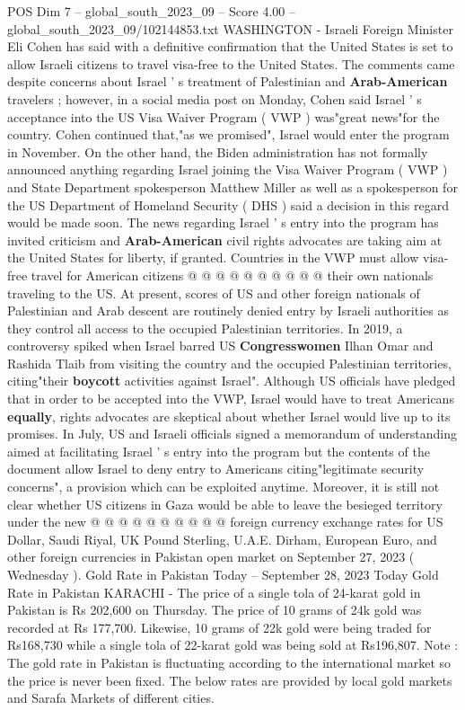 \begin{textsample}{POS Dim 7 – global\_south\_2023\_09 – Score 4.00 – global\_south\_2023\_09/102144853.txt}  \label{ex:f7_pos_121}
WASHINGTON - Israeli Foreign Minister Eli Cohen has said with a definitive confirmation that the United States is set to allow Israeli citizens to travel visa-free to the United States.
The comments came despite concerns about Israel ' s treatment of Palestinian and \textbf{Arab-American} travelers ; however, in a social media post on Monday, Cohen said Israel ' s acceptance into the US Visa Waiver Program ( VWP ) was"great news"for the country.
Cohen continued that,"as we promised", Israel would enter the program in November.
On the other hand, the Biden administration has not formally announced anything regarding Israel joining the Visa Waiver Program ( VWP ) and State Department spokesperson Matthew Miller as well as a spokesperson for the US Department of Homeland Security ( DHS ) said a decision in this regard would be made soon.
The news regarding Israel ' s entry into the program has invited criticism and \textbf{Arab-American} civil rights advocates are taking aim at the United States for liberty, if granted.
Countries in the VWP must allow visa-free travel for American citizens @ @ @ @ @ @ @ @ @ @ their own nationals traveling to the US.
At present, scores of US and other foreign nationals of Palestinian and Arab descent are routinely denied entry by Israeli authorities as they control all access to the occupied Palestinian territories.
In 2019, a controversy spiked when Israel barred US \textbf{Congresswomen} Ilhan Omar and Rashida Tlaib from visiting the country and the occupied Palestinian territories, citing"their \textbf{boycott} activities against Israel".
Although US officials have pledged that in order to be accepted into the VWP, Israel would have to treat Americans \textbf{equally}, rights advocates are skeptical about whether Israel would live up to its promises.
In July, US and Israeli officials signed a memorandum of understanding aimed at facilitating Israel ' s entry into the program but the contents of the document allow Israel to deny entry to Americans citing"legitimate security concerns", a provision which can be exploited anytime.
Moreover, it is still not clear whether US citizens in Gaza would be able to leave the besieged territory under the new @ @ @ @ @ @ @ @ @ @ foreign currency exchange rates for US Dollar, Saudi Riyal, UK Pound Sterling, U.A.E.
Dirham, European Euro, and other foreign currencies in Pakistan open market on September 27, 2023 ( Wednesday ).
Gold Rate in Pakistan Today -- September 28, 2023 Today Gold Rate in Pakistan KARACHI - The price of a single tola of 24-karat gold in Pakistan is Rs 202,600 on Thursday.
The price of 10 grams of 24k gold was recorded at Rs 177,700.
Likewise, 10 grams of 22k gold were being traded for Rs168,730 while a single tola of 22-karat gold was being sold at Rs196,807.
Note : The gold rate in Pakistan is fluctuating according to the international market so the price is never been fixed.
The below rates are provided by local gold markets and Sarafa Markets of different cities.

\end{textsample}
